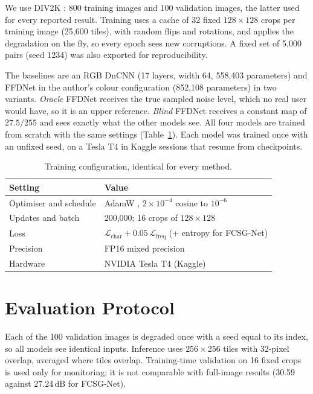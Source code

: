 \documentclass[12pt,a4paper,oneside]{NITR}
\newcommand{\fcsg}{FCSG-Net}
\newcommand{\dB}{\,dB}
\begin{document}
We use DIV2K \cite{agustsson2017div2k}: 800 training images and 100
validation images, the latter used for every reported result. Training uses
a cache of 32 fixed $128\times128$ crops per training image (25,600 tiles),
with random flips and rotations, and applies the degradation on the fly, so
every epoch sees new corruptions. A fixed set of 5,000 pairs (seed 1234) was
also exported for reproducibility.

The baselines are an RGB DnCNN (17 layers, width 64, 558,403 parameters) and
FFDNet in the author's colour configuration (852,108 parameters) in two
variants. \emph{Oracle} FFDNet receives the true sampled noise level, which
no real user would have, so it is an upper reference. \emph{Blind} FFDNet
receives a constant map of $27.5/255$ and sees exactly what the other models
see. All four models are trained from scratch with the same settings
(Table~\ref{tab:hparams}). Each model was trained once with an unfixed seed,
on a Tesla T4 in Kaggle sessions that resume from checkpoints.

\begin{table}[htbp]
	\centering
	\caption{Training configuration, identical for every method.}
	\label{tab:hparams}
	\small
	\begin{tabular}{@{}ll@{}}
		\toprule
		Setting & Value \\
		\midrule
		Optimiser and schedule & AdamW \cite{loshchilov2019adamw}, $2\times10^{-4}$ cosine \cite{loshchilov2017sgdr} to $10^{-6}$ \\
		Updates and batch      & 200,000; 16 crops of $128\times128$ \\
		Loss                   & $\mathcal{L}_\text{char}+0.05\,\mathcal{L}_\text{freq}$ (+ entropy for \fcsg{}) \\
		Precision              & FP16 mixed precision \cite{micikevicius2018amp} \\
		Hardware               & NVIDIA Tesla T4 (Kaggle) \\
		\bottomrule
	\end{tabular}
\end{table}

\section{Evaluation Protocol}\label{sec:evalproto}

Each of the 100 validation images is degraded once with a seed equal to its
index, so all models see identical inputs. Inference uses $256\times256$
tiles with 32-pixel overlap, averaged where tiles overlap. Training-time
validation on 16 fixed crops is used only for monitoring; it is not
comparable with full-image results (30.59 against 27.24\dB{} for \fcsg{}).
\end{document}
